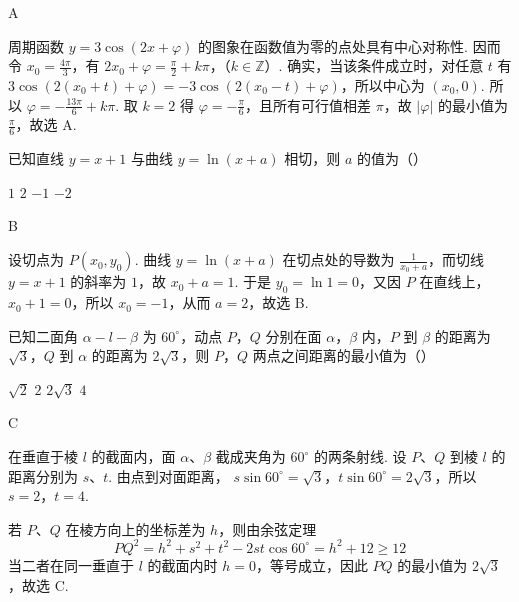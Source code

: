 \begin{answer}
A
\end{answer}

\begin{solution}
周期函数 \(y=3\cos(2x+\varphi)\) 的图象在函数值为零的点处具有中心对称性. 因而令
\(x_0=\frac{4\pi}{3}\)，有
\(2x_0+\varphi=\frac{\pi}{2}+k\pi\)，（\(k\in\mathbb Z\)）.
确实，当该条件成立时，对任意 \(t\) 有
\(3\cos(2(x_0+t)+\varphi)=-3\cos(2(x_0-t)+\varphi)\)，所以中心为
\((x_0,0)\).
所以
\(\varphi=-\frac{13\pi}{6}+k\pi\). 取 \(k=2\) 得 \(\varphi=-\frac{\pi}{6}\)，且所有可行值相差 \(\pi\)，故 \(\lvert\varphi\rvert\) 的最小值为 \(\frac{\pi}{6}\)，故选 A.
\end{solution}

\begin{problem}
已知直线 \( y = x + 1 \) 与曲线 \( y = \ln\left(x + a\right) \) 相切，则 \( a \) 的值为（\quad）

\choices
    {\(1\)}
    {\(2\)}
    {\(-1\)}
    {\(-2\)}
\end{problem}

\begin{answer}
B
\end{answer}

\begin{solution}
设切点为 \(P(x_0,y_0)\). 曲线 \(y=\ln(x+a)\) 在切点处的导数为 \(\frac{1}{x_0+a}\)，而切线 \(y=x+1\) 的斜率为 \(1\)，故
\(x_0+a=1\). 于是 \(y_0=\ln1=0\)，又因 \(P\) 在直线上，\(x_0+1=0\)，所以 \(x_0=-1\)，从而 \(a=2\)，故选 B.
\end{solution}

\begin{problem}
已知二面角 \(\alpha - l - \beta\) 为 \(60^{\circ}\)，动点 \(P\)，\(Q\) 分别在面 \(\alpha\)，\(\beta\) 内，\(P\) 到 \(\beta\) 的距离为 \(\sqrt{3}\)，\(Q\) 到 \(\alpha\) 的距离为 \(2\sqrt{3}\)，则 \(P\)，\(Q\) 两点之间距离的最小值为（\quad）

\choices
    {\(\sqrt{2}\)}
    {\(2\)}
    {\(2\sqrt{3}\)}
    {\(4\)}
\end{problem}

\begin{answer}
C
\end{answer}

\begin{solution}
在垂直于棱 \(l\) 的截面内，面 \(\alpha\)、\(\beta\) 截成夹角为 \(60^{\circ}\) 的两条射线. 设 \(P\)、\(Q\) 到棱 \(l\) 的距离分别为 \(s\)、\(t\). 由点到对面距离，
\(s\sin60^{\circ}=\sqrt3\)，\(t\sin60^{\circ}=2\sqrt3\)，所以 \(s=2\)，\(t=4\).

若 \(P\)、\(Q\) 在棱方向上的坐标差为 \(h\)，则由余弦定理
\[
PQ^2=h^2+s^2+t^2-2st\cos60^{\circ}=h^2+12\geqslant12
\]
当二者在同一垂直于 \(l\) 的截面内时 \(h=0\)，等号成立，因此 \(PQ\) 的最小值为 \(2\sqrt3\)，故选 C.
\end{solution}

